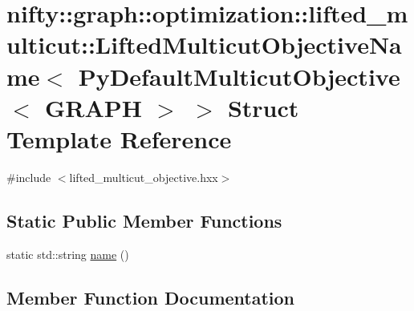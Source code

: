 \hypertarget{structnifty_1_1graph_1_1optimization_1_1lifted__multicut_1_1LiftedMulticutObjectiveName_3_01PyDe355903af316bd27192e064a422e0c831}{}\section{nifty\+:\+:graph\+:\+:optimization\+:\+:lifted\+\_\+multicut\+:\+:Lifted\+Multicut\+Objective\+Name$<$ Py\+Default\+Multicut\+Objective$<$ G\+R\+A\+P\+H $>$ $>$ Struct Template Reference}
\label{structnifty_1_1graph_1_1optimization_1_1lifted__multicut_1_1LiftedMulticutObjectiveName_3_01PyDe355903af316bd27192e064a422e0c831}


{\ttfamily \#include $<$lifted\+\_\+multicut\+\_\+objective.\+hxx$>$}

\subsection*{Static Public Member Functions}
\begin{DoxyCompactItemize}
\item 
static std\+::string \hyperlink{structnifty_1_1graph_1_1optimization_1_1lifted__multicut_1_1LiftedMulticutObjectiveName_3_01PyDe355903af316bd27192e064a422e0c831_aca90f7991809b014b8d07c03d19abcd2}{name} ()
\end{DoxyCompactItemize}


\subsection{Member Function Documentation}
\hypertarget{structnifty_1_1graph_1_1optimization_1_1lifted__multicut_1_1LiftedMulticutObjectiveName_3_01PyDe355903af316bd27192e064a422e0c831_aca90f7991809b014b8d07c03d19abcd2}{}
